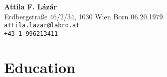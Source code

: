 \documentclass[letterpaper,11pt]{article}
\begin{document}

\setlength{\leftmargini}{2em}
\renewcommand{\labelitemi}{}



 \Huge  \textbf{Attila F. L\'{a}z\'{a}r} \\
        \normalsize Erdbergstra\ss{}e 46/2/34, 1030 Wien  \hfill  Born 06.20.1979\\
		\hfill \texttt{attila.lazar@labro.at}  \\
		\hfill \texttt{+43 1 996213411} \\
        \par \normalsize \normalfont





\section{\bf Education}
        	
\end{document}
